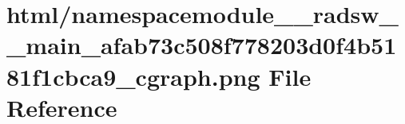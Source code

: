 \hypertarget{namespacemodule____radsw____main__afab73c508f778203d0f4b5181f1cbca9__cgraph_8png}{}\section{html/namespacemodule\+\_\+\+\_\+radsw\+\_\+\+\_\+main\+\_\+afab73c508f778203d0f4b5181f1cbca9\+\_\+cgraph.png File Reference}
\label{namespacemodule____radsw____main__afab73c508f778203d0f4b5181f1cbca9__cgraph_8png}
